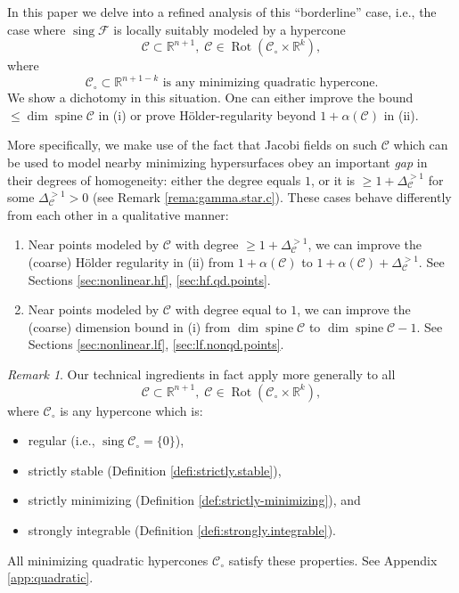 \documentclass[11pt, letterpaper, reqno]{amsart}
\numberwithin{equation}{section}
\theoremstyle{remark}
\newtheorem{Rem}[Def]{Remark}
\newcommand{\RR}{\mathbb{R}}
\newcommand{\cC}{\mathcal{C}}
\newcommand{\sing}{\operatorname{sing}}
\newcommand{\spine}{\operatorname{spine}}
\newcommand{\Rot}{\operatorname{Rot}}
\begin{document}
In this paper we delve into a refined analysis of this ``borderline'' case, i.e., the case where $\sing \mathscr{F}$ is locally suitably modeled by a hypercone
\[ \cC \subset \RR^{n+1}, \; \cC \in \Rot(\cC_\circ \times \RR^k), \]
where
\[ \cC_\circ \subset \RR^{n+1-k} \text{ is any minimizing quadratic hypercone}. \]
We show a dichotomy in this situation. One can either improve the bound $\leq \dim \spine \cC$ in (i) or prove H\"older-regularity beyond $1 + \alpha(\cC)$ in (ii). 

More specifically, we make use of the fact that Jacobi fields on such $\cC$ which can be used to model nearby minimizing hypersurfaces obey an important \emph{gap} in their degrees of homogeneity: either the degree equals $1$, or it is $\geq 1 + \Delta^{>1}_\cC$ for some $\Delta^{>1}_\cC > 0$ (see Remark \ref{rema:gamma.star.c}). These cases behave differently from each other in a qualitative manner:

\begin{enumerate}
	\item Near points modeled by $\cC$ with degree $\geq 1 + \Delta^{>1}_\cC$, we can improve the (coarse) H\"older regularity in (ii) from $1 + \alpha(\cC)$ to $1 + \alpha(\cC) + \Delta^{>1}_\cC$. See Sections \ref{sec:nonlinear.hf}, \ref{sec:hf.qd.points}.
	\item Near points modeled by $\cC$ with degree equal to $1$, we can improve the (coarse) dimension bound in (i) from $\dim \spine \cC$ to $\dim \spine \cC - 1$. See Sections \ref{sec:nonlinear.lf}, \ref{sec:lf.nonqd.points}.
\end{enumerate}

\begin{Rem} \label{rema:intro.quadratic.generalized}
	Our technical ingredients in fact apply more generally to all 
	\[ \cC \subset \RR^{n+1}, \; \cC \in \Rot(\cC_\circ \times \RR^k), \]
	where $\cC_\circ$ is any hypercone which is:
	\begin{itemize}
		\item regular (i.e., $\sing \cC_\circ = \{ 0 \}$),
		\item strictly stable (Definition \ref{defi:strictly.stable}), 
		\item strictly minimizing (Definition \ref{def:strictly-minimizing}), and 
		\item strongly integrable (Definition \ref{defi:strongly.integrable}). 
	\end{itemize}
	All minimizing quadratic hypercones $\cC_\circ$ satisfy these properties. See Appendix \ref{app:quadratic}.
\end{Rem}
\end{document}
